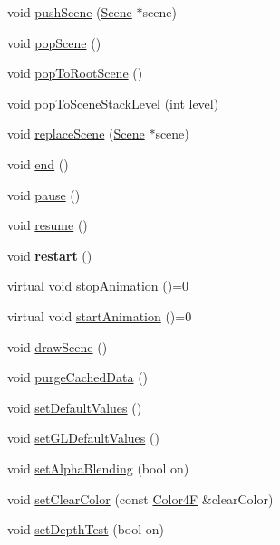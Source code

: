 \begin{DoxyCompactItemize}
\item 
void \hyperlink{classDirector_ad113f1a2b5ab297788caa791b57f458b}{push\+Scene} (\hyperlink{classScene}{Scene} $\ast$scene)
\item 
void \hyperlink{classDirector_a92916c5c47d0f0a202fe1a5023841e8b}{pop\+Scene} ()
\item 
void \hyperlink{classDirector_a3990819e9d112e26258290ca82d91999}{pop\+To\+Root\+Scene} ()
\item 
void \hyperlink{classDirector_a56f61d47f337d996c069ca7aac5b3c79}{pop\+To\+Scene\+Stack\+Level} (int level)
\item 
void \hyperlink{classDirector_a75d57e62351449bb5a4ed2cd7412fb25}{replace\+Scene} (\hyperlink{classScene}{Scene} $\ast$scene)
\item 
void \hyperlink{classDirector_ac609b09cf1e1054e588d2d25ecd51c36}{end} ()
\item 
void \hyperlink{classDirector_ad0e2e9b810e39c939e25ead3918faf00}{pause} ()
\item 
void \hyperlink{classDirector_a851df0aed8d550cc85159063b0c85dac}{resume} ()
\item 
\mbox{\label{classDirector_a4043394eae66baf0f307121e442610d1}} 
void {\bfseries restart} ()
\item 
virtual void \hyperlink{classDirector_abe981a5c5d35aaf6c2aaf1b55f023e82}{stop\+Animation} ()=0
\item 
virtual void \hyperlink{classDirector_a122d685c783d0c2b7e2d22ba1ecb0d91}{start\+Animation} ()=0
\item 
void \hyperlink{classDirector_a9ab4f229ddfcf735ded9b8f25e091481}{draw\+Scene} ()
\item 
void \hyperlink{classDirector_aed3733d86c85ee8d1f4966801ba5ad19}{purge\+Cached\+Data} ()
\item 
void \hyperlink{classDirector_a55475c9785f74187a7d337d117224953}{set\+Default\+Values} ()
\item 
void \hyperlink{classDirector_a7271f672c2afb904023fe0510fbe215f}{set\+G\+L\+Default\+Values} ()
\item 
void \hyperlink{classDirector_a405b60d715c4828cc4541dfc5c34c04f}{set\+Alpha\+Blending} (bool on)
\item 
void \hyperlink{classDirector_a50fe8a47a3b94dc42366099e5862de40}{set\+Clear\+Color} (const \hyperlink{structColor4F}{Color4F} \&clear\+Color)
\item 
void \hyperlink{classDirector_a24a276dd9029d03e564c07750872aef6}{set\+Depth\+Test} (bool on)

\end{DoxyCompactItemize}
